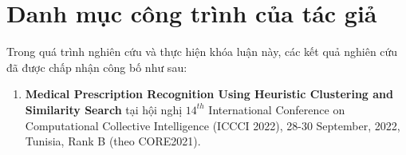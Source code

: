 \appendix

\chapter{Danh mục công trình của tác giả}

Trong quá trình nghiên cứu và thực hiện khóa luận này, các kết quả nghiên cứu đã được chấp nhận công bố như sau:

\begin{enumerate}

\item \textbf{Medical Prescription Recognition Using Heuristic Clustering and Similarity Search} tại hội nghị $14^{th}$ International Conference on Computational Collective Intelligence (ICCCI 2022), 28-30 September, 2022, Tunisia, Rank B (theo CORE2021).

\end{enumerate}